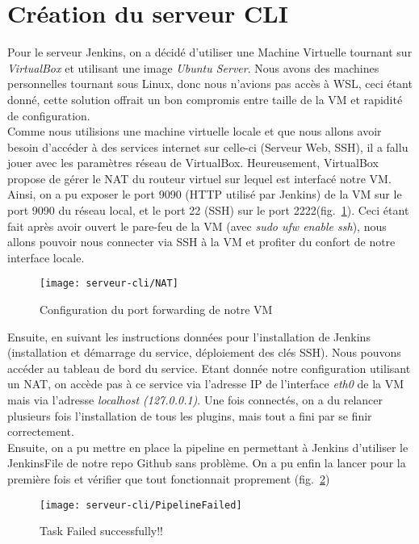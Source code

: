 
\section{Création du serveur CLI}
Pour le serveur Jenkins, on a décidé d'utiliser une Machine Virtuelle tournant sur \textit{VirtualBox} et utilisant une image \textit{Ubuntu Server}.
Nous avons des machines personnelles tournant sous Linux, donc nous n'avions pas accès à WSL, ceci étant donné, cette solution offrait un bon compromis entre taille de la VM et rapidité de configuration.\\

Comme nous utilisions une machine virtuelle locale et que nous allons avoir besoin d'accéder à des services internet sur celle-ci (Serveur Web, SSH), il a fallu jouer avec les paramètres réseau de VirtualBox.
Heureusement, VirtualBox propose de gérer le NAT du routeur virtuel sur lequel est interfacé notre VM\@.
Ainsi, on a pu exposer le port 9090 (HTTP utilisé par Jenkins) de la VM sur le port 9090 du réseau local, et le port 22 (SSH) sur le port 2222\@ (fig.~\ref{fig:NAT}).
Ceci étant fait après avoir ouvert le pare-feu de la VM (avec \textit{sudo ufw enable ssh}), nous allons pouvoir nous connecter via SSH à la VM et profiter du confort de notre interface locale.\\

\begin{figure}[h]
    \centering
    \texttt{[image: serveur-cli/NAT]}
    \caption{Configuration du port forwarding de notre VM}
    \label{fig:NAT}
\end{figure}


Ensuite, en suivant les instructions données pour l'installation de Jenkins (installation et démarrage du service, déploiement des clés SSH). Nous pouvons accéder au tableau de bord du service.
Etant donnée notre configuration utilisant un NAT, on accède pas à ce service via l'adresse IP de l'interface \textit{eth0} de la VM mais via l'adresse \textit{localhost (127.0.0.1)}.
Une fois connectés, on a du relancer plusieurs fois l'installation de tous les plugins, mais tout a fini par se finir correctement.\\

Ensuite, on a pu mettre en place la pipeline en permettant à Jenkins d'utiliser le JenkinsFile de notre repo Github sans problème\@.
On a pu enfin la lancer pour la première fois et vérifier que tout fonctionnait proprement (fig.~\ref{fig:PipelineFailed})

\begin{figure}[h]
    \centering
    \texttt{[image: serveur-cli/PipelineFailed]}
    \caption{Task Failed successfully!!}
    \label{fig:PipelineFailed}
\end{figure}


